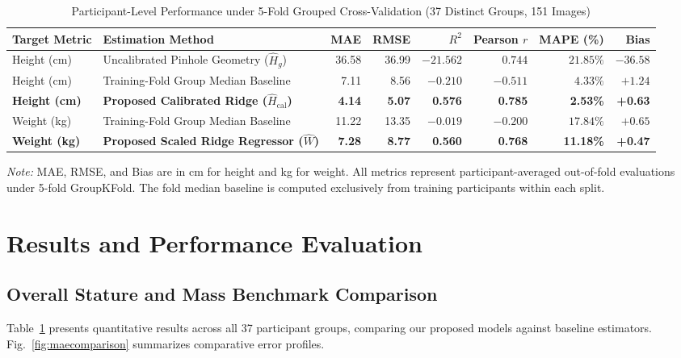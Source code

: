 \documentclass[conference]{IEEEtran}
\begin{document}
\begin{table}[!t]
\caption{Participant-Level Performance under 5-Fold Grouped Cross-Validation (37 Distinct Groups, 151 Images)}
\label{tab:overall}
\centering
\footnotesize
\renewcommand{\arraystretch}{1.20}
\begin{tabular*}{\textwidth}{@{\extracolsep{\fill}}llrrrrrr@{}}
\toprule
\textbf{Target Metric} & \textbf{Estimation Method} & \textbf{MAE} & \textbf{RMSE} & \textbf{$R^2$} & \textbf{Pearson $r$} & \textbf{MAPE (\%)} & \textbf{Bias}\\
\midrule
Height (cm) & Uncalibrated Pinhole Geometry ($\widehat{H}_g$) & 36.58 & 36.99 & $-21.562$ & $0.744$ & $21.85\%$ & $-36.58$\\
Height (cm) & Training-Fold Group Median Baseline & 7.11 & 8.56 & $-0.210$ & $-0.511$ & $4.33\%$ & $+1.24$\\
\textbf{Height (cm)} & \textbf{Proposed Calibrated Ridge ($\widehat{H}_{\text{cal}}$)} & \textbf{4.14} & \textbf{5.07} & \textbf{0.576} & \textbf{0.785} & \textbf{2.53\%} & \textbf{+0.63}\\
\midrule
Weight (kg) & Training-Fold Group Median Baseline & 11.22 & 13.35 & $-0.019$ & $-0.200$ & $17.84\%$ & $+0.65$\\
\textbf{Weight (kg)} & \textbf{Proposed Scaled Ridge Regressor ($\widehat{W}$)} & \textbf{7.28} & \textbf{8.77} & \textbf{0.560} & \textbf{0.768} & \textbf{11.18\%} & \textbf{+0.47}\\
\bottomrule
\end{tabular*}
\vspace{2pt}
\begin{minipage}{\textwidth}
\scriptsize \textit{Note:} MAE, RMSE, and Bias are in cm for height and kg for weight. All metrics represent participant-averaged out-of-fold evaluations under 5-fold GroupKFold. The fold median baseline is computed exclusively from training participants within each split.
\end{minipage}
\end{table}

\section{Results and Performance Evaluation}
\subsection{Overall Stature and Mass Benchmark Comparison}
Table~\ref{tab:overall} presents quantitative results across all 37 participant groups, comparing our proposed models against baseline estimators. Fig.~\ref{fig:maecomparison} summarizes comparative error profiles.
\end{document}

